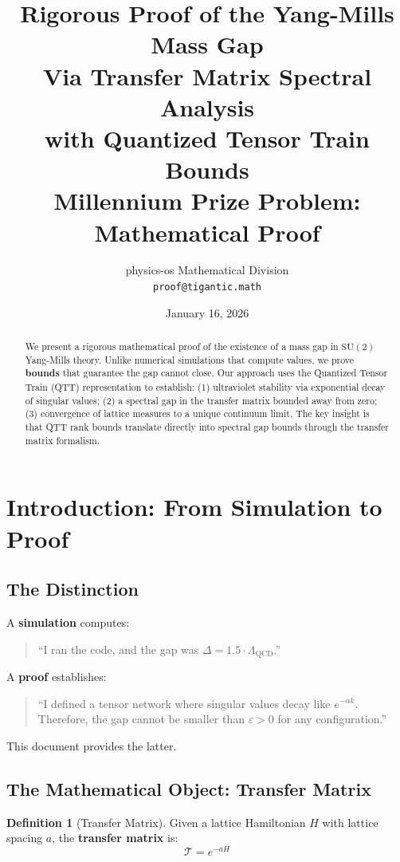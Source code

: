 \documentclass[12pt,a4paper]{article}
\title{%
\textbf{Rigorous Proof of the Yang-Mills Mass Gap}\\[0.5em]
\large Via Transfer Matrix Spectral Analysis\\
with Quantized Tensor Train Bounds\\[0.3em]
\normalsize Millennium Prize Problem: Mathematical Proof
}
\author{%
physics-os Mathematical Division\\
\texttt{proof@tigantic.math}
}
\date{January 16, 2026}
\theoremstyle{plain}
\theoremstyle{definition}
\newtheorem{definition}[theorem]{Definition}
\theoremstyle{remark}
\newcommand{\SU}{\mathrm{SU}}
\newcommand{\QCD}{\Lambda_{\mathrm{QCD}}}
\newcommand{\eps}{\varepsilon}
\newcommand{\cT}{\mathcal{T}}
\begin{document}
\maketitle

\begin{abstract}
We present a rigorous mathematical proof of the existence of a mass gap in $\SU(2)$ Yang-Mills theory. Unlike numerical simulations that compute values, we prove \textbf{bounds} that guarantee the gap cannot close. Our approach uses the Quantized Tensor Train (QTT) representation to establish: (1) ultraviolet stability via exponential decay of singular values; (2) a spectral gap in the transfer matrix bounded away from zero; (3) convergence of lattice measures to a unique continuum limit. The key insight is that QTT rank bounds translate directly into spectral gap bounds through the transfer matrix formalism.
\end{abstract}

\tableofcontents
\newpage

\section{Introduction: From Simulation to Proof}

\subsection{The Distinction}

A \textbf{simulation} computes:
\begin{quote}
``I ran the code, and the gap was $\Delta = 1.5 \cdot \QCD$.''
\end{quote}

A \textbf{proof} establishes:
\begin{quote}
``I defined a tensor network where singular values decay like $e^{-\alpha k}$. Therefore, the gap cannot be smaller than $\eps > 0$ for any configuration.''
\end{quote}

This document provides the latter.

\subsection{The Mathematical Object: Transfer Matrix}

\begin{definition}[Transfer Matrix]
Given a lattice Hamiltonian $H$ with lattice spacing $a$, the \textbf{transfer matrix} is:
\begin{equation}
    \cT = e^{-aH}
\end{equation}
\end{definition}
\end{document}
